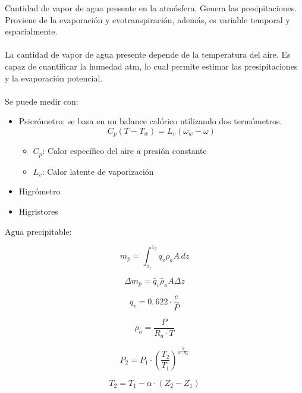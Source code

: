 Cantidad de vapor de agua presente en la atmósfera. Genera las presipitaciones. Proviene de la evaporación y evotranspiración, además, es variable temporal y espacialmente.
\\\\
La cantidad de vapor de agua presente depende de la temperatura del aire. Es capaz de cuantificar la humedad atm, lo cual permite estimar las presipitaciones y la evaporación potencial.
\\\\
Se puede medir con:
\begin{itemize}
    \item Psicrómetro: se basa en un balance calórico utilizando dos termómetros.
    \begin{equation}
        C_p (T - T_w) = L_v (\omega_w - \omega)
        \end{equation}
    \begin{itemize}
            \item $C_p$: Calor específico del aire a presión constante
            \item $L_v$: Calor latente de vaporización
    \end{itemize}
    \item Higrómetro
    \item Higristores
\end{itemize}

Agua precipitable:

\begin{equation}
    m_p = \int_{z_1}^{z_2} q_v \rho_a A \, dz
\end{equation}
    
\begin{equation}
    \Delta m_p = \bar{q}_v \bar{\rho}_a A \Delta z
\end{equation}

\begin{equation}
    q_v = 0,622 \cdot \frac{e}{P}
\end{equation}

\begin{equation}
    \rho_a = \frac{P}{R_a \cdot T}
\end{equation}

\begin{equation}
    P_2 = P_1 \cdot \left(\frac{T_2}{T_1}\right)^{\frac{g}{\alpha \cdot R_a}}
\end{equation}

\begin{equation}
    T_2 = T_1 - \alpha \cdot (Z_2 - Z_1)
\end{equation}

